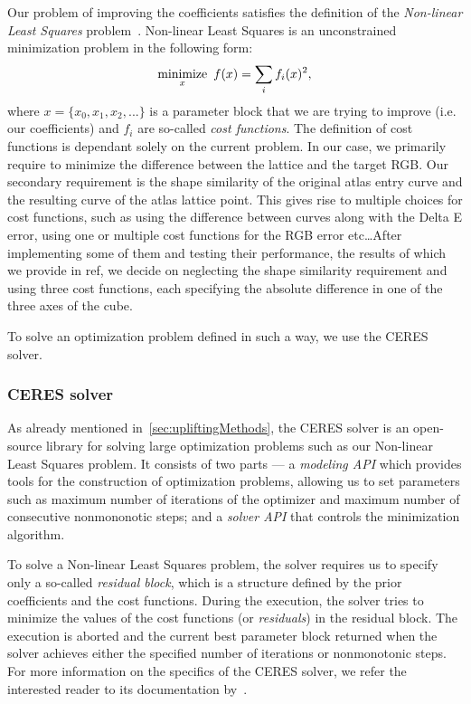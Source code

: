 Our problem of improving the coefficients satisfies the definition of the \emph{Non-linear Least Squares} problem~\cite{nonLinearLeastSquares}. Non-linear Least Squares is an unconstrained minimization problem in the following form:
\begin{equation} \label{eq:nonLinearLeastSquares}
	 \underset{x}{\text{minimize}} \hspace{0.5em} f(x) = \sum_{i} f_{i}(x)^{2},
\end{equation}
where $x= \{x_{0}, x_{1}, x_{2}, ... \}$ is a parameter block that we are trying to improve (i.e. our coefficients) and $f_{i}$ are so-called \emph{cost functions}. The definition of cost functions is dependant solely on the current problem. In our case, we primarily require to minimize the difference between the lattice and the target RGB. Our secondary requirement is the shape similarity of the original atlas entry curve and the resulting curve of the atlas lattice point. This gives rise to multiple choices for cost functions, such as using the difference between curves along with the Delta E error, using one or multiple cost functions for the RGB error etc\ldots After implementing some of them and testing their performance, the results of which we provide in ref, we decide on neglecting the shape similarity requirement and using three cost functions, each specifying the absolute difference in one of the three axes of the cube.

To solve an optimization problem defined in such a way, we use the CERES solver.

\subsubsection{CERES solver} \label{ssec:ceresSolver}

As already mentioned in~\cref{sec:upliftingMethods}, the CERES solver is an open-source library for solving large optimization problems such as our Non-linear Least Squares problem. It consists of two parts --- a \emph{modeling API} which provides tools for the construction of optimization problems, allowing us to set parameters such as maximum number of iterations of the optimizer and maximum number of consecutive nonmononotic steps; and a \emph{solver API} that controls the minimization algorithm.

To solve a Non-linear Least Squares problem, the solver requires us to specify only a so-called \emph{residual block}, which is a structure defined by the prior coefficients and the cost functions. During the execution, the solver tries to minimize the values of the cost functions (or \emph{residuals}) in the residual block. The execution is aborted and the current best parameter block returned when the solver achieves either the specified number of iterations or nonmonotonic steps. For more information on the specifics of the CERES solver, we refer the interested reader to its documentation by~\citet{ceresNonLinearLeastSquares}.

